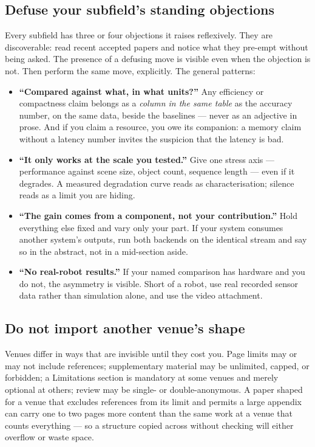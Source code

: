 \documentclass[11pt,a4paper]{article}
\begin{document}
\subsection*{Defuse your subfield's standing objections}

Every subfield has three or four objections it raises reflexively. They are
discoverable: read recent accepted papers and notice what they pre-empt
without being asked. The presence of a defusing move is visible even when the
objection is not. Then perform the same move, explicitly. The general
patterns:

\begin{itemize}
  \item \textbf{``Compared against what, in what units?''} Any efficiency or
    compactness claim belongs as a \emph{column in the same table} as the
    accuracy number, on the same data, beside the baselines --- never as an
    adjective in prose. And if you claim a resource, you owe its companion:
    a memory claim without a latency number invites the suspicion that the
    latency is bad.
  \item \textbf{``It only works at the scale you tested.''} Give one
    stress axis --- performance against scene size, object count, sequence
    length --- even if it degrades. A measured degradation curve reads as
    characterisation; silence reads as a limit you are hiding.
  \item \textbf{``The gain comes from a component, not your contribution.''}
    Hold everything else fixed and vary only your part. If your system
    consumes another system's outputs, run both backends on the identical
    stream and say so in the abstract, not in a mid-section aside.
  \item \textbf{``No real-robot results.''} If your named comparison has
    hardware and you do not, the asymmetry is visible. Short of a robot, use
    real recorded sensor data rather than simulation alone, and use the video
    attachment.
\end{itemize}

\subsection*{Do not import another venue's shape}

Venues differ in ways that are invisible until they cost you. Page limits may
or may not include references; supplementary material may be unlimited,
capped, or forbidden; a Limitations section is mandatory at some venues and
merely optional at others; review may be single- or double-anonymous. A paper
shaped for a venue that excludes references from its limit and permits a large
appendix can carry one to two pages more content than the same work at a venue
that counts everything --- so a structure copied across without checking will
either overflow or waste space.
\end{document}
